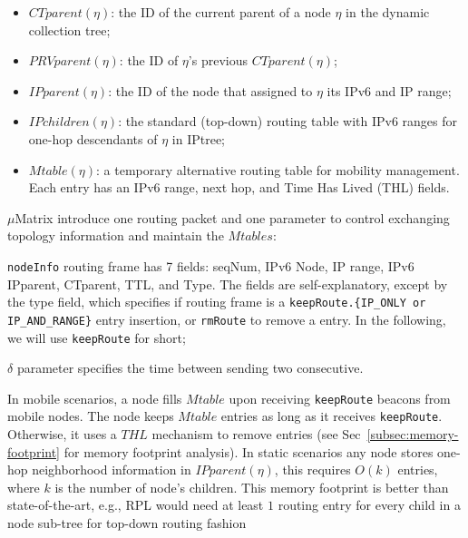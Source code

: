 \begin{itemize}
    \item $CTparent(\eta)$: the ID of the current parent of a node $\eta$ in the dynamic collection tree;
    
    \item  $PRVparent(\eta)$: the ID of $\eta$'s previous $CTparent(\eta)$;
    
    \item  $IPparent(\eta)$: the ID of the node that assigned to $\eta$ its IPv6 and IP range; %
              
    \item  $IPchildren(\eta)$: the standard (top-down) routing table with IPv6 ranges for one-hop descendants of $\eta$ in IPtree;
    
    \item $Mtable(\eta)$: a temporary alternative routing table for mobility management. Each entry has an IPv6 range, next hop, and Time Has Lived (THL) fields.
        
\end{itemize}

$\mu$Matrix introduce one routing packet and one parameter to control exchanging topology information and maintain the $Mtables$:
\begin{inparaenum}[i)]
    \item \texttt{nodeInfo} routing frame has 7 fields: seqNum, IPv6 Node, IP range, IPv6 IPparent, CTparent, TTL, and Type. The fields are self-explanatory, except by the type field, which specifies if routing frame is a \texttt{keepRoute.\{IP\_ONLY or IP\_AND\_RANGE\}} entry insertion, or \texttt{rmRoute} to remove a entry. In the following, we will use \texttt{keepRoute} for short;
    \item \texttt{$\delta$} parameter specifies the time between sending two consecutive.
\end{inparaenum}

In mobile scenarios, a node fills $Mtable$ upon receiving \texttt{keepRoute} beacons from mobile nodes. The node keeps $Mtable$ entries as long as it receives \texttt{keepRoute}. Otherwise, it uses a $THL$ mechanism to remove entries (see Sec~\ref{subsec:memory-footprint} for memory footprint analysis). In static scenarios any node stores one-hop neighborhood information in $IPparent(\eta)$, this requires $O(k)$ entries, where $k$ is the number of node's children. This memory footprint is better than state-of-the-art, e.g., RPL would need at least $1$ routing entry for every child in a node sub-tree for top-down routing fashion

